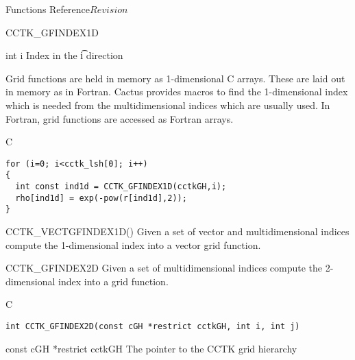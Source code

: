 \begin{cactuspart}{ Functions Reference}{}{$Revision$}
\begin{FunctionDescription}{CCTK\_GFINDEX1D}
\begin{ParameterSection}
\begin{Parameter} {int i}
Index in the \t{i} direction
\end{Parameter}
\end{ParameterSection}

\begin{Discussion}
Grid functions are held in memory as 1-dimensional C arrays. These are
laid out in memory as in Fortran. Cactus provides macros to find the
1-dimensional index which is needed from the multidimensional indices which
are usually used. In Fortran, grid functions are accessed as Fortran arrays.
\end{Discussion}
\begin{ExampleSection}
\begin{Example}{C}
\begin{verbatim}
for (i=0; i<cctk_lsh[0]; i++)
{
  int const ind1d = CCTK_GFINDEX1D(cctkGH,i);
  rho[ind1d] = exp(-pow(r[ind1d],2));
}
\end{verbatim}
\end{Example}
\end{ExampleSection}
\begin{SeeAlsoSection}
\begin{SeeAlso}{CCTK\_VECTGFINDEX1D()}
Given a set of vector and multidimensional indices compute the 1-dimensional
index into a vector grid function.
\end{SeeAlso}

\end{SeeAlsoSection}
\end{FunctionDescription}



\begin{FunctionDescription}{CCTK\_GFINDEX2D}
\label{CCTK-GFINDEX2D}
Given a set of multidimensional indices compute the 2-dimensional index into a
grid function.
\begin{SynopsisSection}
\begin{Synopsis}{C}
\begin{verbatim}
int CCTK_GFINDEX2D(const cGH *restrict cctkGH, int i, int j)
\end{verbatim}
\end{Synopsis}
\end{SynopsisSection}

\begin{ParameterSection}
\begin{Parameter} {const cGH *restrict cctkGH}
The pointer to the CCTK grid hierarchy
\end{Parameter}


\end{ParameterSection}
\end{FunctionDescription}
\end{cactuspart}
